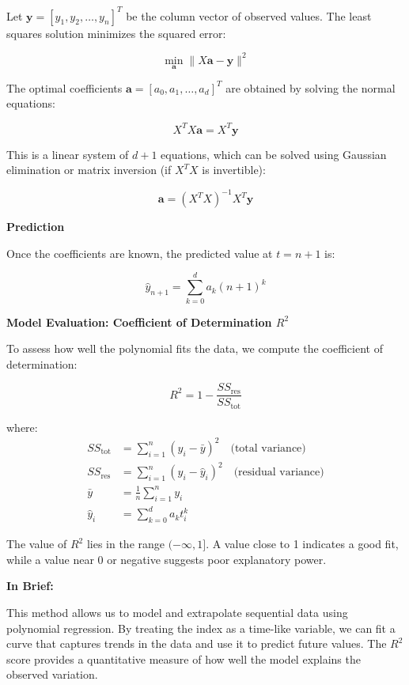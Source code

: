 \documentclass[a4paper, 18pt]{book} %
\begin{document}
Let \( \mathbf{y} = [y_1, y_2, \dots, y_n]^T \) be the column vector of observed values. The least squares solution minimizes the squared error:

\[
\min_{\mathbf{a}} \| X \mathbf{a} - \mathbf{y} \|^2
\]

The optimal coefficients \( \mathbf{a} = [a_0, a_1, \dots, a_d]^T \) are obtained by solving the normal equations:

\[
X^T X \mathbf{a} = X^T \mathbf{y}
\]

This is a linear system of \( d+1 \) equations, which can be solved using Gaussian elimination or matrix inversion (if \( X^T X \) is invertible):

\[
\mathbf{a} = (X^T X)^{-1} X^T \mathbf{y}
\]

\vspace{2em}

\textbf{Prediction}

Once the coefficients are known, the predicted value at \( t = n+1 \) is:

\[
\hat{y}_{n+1} = \sum_{k=0}^{d} a_k (n+1)^k
\]


\vspace{2em}

\textbf{Model Evaluation: Coefficient of Determination \( R^2 \)}

To assess how well the polynomial fits the data, we compute the coefficient of determination:

\[
R^2 = 1 - \frac{SS_{\text{res}}}{SS_{\text{tot}}}
\]

where:
\begin{align*}
SS_{\text{tot}} &= \sum_{i=1}^{n} (y_i - \bar{y})^2 \quad \text{(total variance)} \\
SS_{\text{res}} &= \sum_{i=1}^{n} (y_i - \hat{y}_i)^2 \quad \text{(residual variance)} \\
\bar{y} &= \frac{1}{n} \sum_{i=1}^{n} y_i \\
\hat{y}_i &= \sum_{k=0}^{d} a_k t_i^k
\end{align*}

The value of \( R^2 \) lies in the range \( (-\infty, 1] \). A value close to 1 indicates a good fit, while a value near 0 or negative suggests poor explanatory power.

\vspace{2em}

\textbf{In Brief:}

This method allows us to model and extrapolate sequential data using polynomial regression\cite{draper1998applied}. By treating the index as a time-like variable, we can fit a curve that captures trends in the data and use it to predict future values\cite{nandi2020polynomial}. The \( R^2 \) score provides a quantitative measure of how well the model explains the observed variation.
\end{document}
